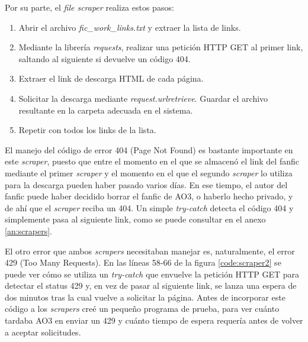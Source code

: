 \documentclass{pre-tfg}
\newcommand{\refToFileScraperCode}{\ref{an:scrapers}}
\begin{document}
Por su parte, el \textit{file scraper} realiza estos pasos:
\begin{enumerate}
	\item Abrir el archivo \textit{fic\_work\_links.txt} y extraer la lista de links.
	\item Mediante la librería \textit{requests}, realizar una petición HTTP GET al primer link, saltando al siguiente si devuelve un código 404.
	\item Extraer el link de descarga HTML de cada página.
	\item Solicitar la descarga mediante \textit{request.urlretrieve}. Guardar el archivo resultante en la carpeta adecuada en el sistema.
	\item Repetir con todos los links de la lista.
\end{enumerate}

El manejo del código de error 404 (Page Not Found) es bastante importante en este \textit{scraper}, puesto que entre el momento en el que se almacenó el link del fanfic mediante el primer \textit{scraper} y el momento en el que el segundo \textit{scraper} lo utiliza para la descarga pueden haber pasado varios días. En ese tiempo, el autor del fanfic puede haber decidido borrar el fanfic de AO3, o haberlo hecho privado, y de ahí que el \textit{scraper} reciba un 404. Un simple \textit{try-catch} detecta el código 404 y simplemente pasa al siguiente link, como se puede consultar en el anexo \refToFileScraperCode.

El otro error que ambos \textit{scrapers} necesitaban manejar es, naturalmente, el error 429 (Too Many Requests). En las líneas 58-66 de la figura \ref{code:scraper2} se puede ver cómo se utiliza un \textit{try-catch} que envuelve la petición HTTP GET para detectar el status 429 y, en vez de pasar al siguiente link, se lanza una espera de dos minutos tras la cual vuelve a solicitar la página. Antes de incorporar este código a los \textit{scrapers} creé un pequeño programa de prueba, para ver cuánto tardaba AO3 en enviar un 429 y cuánto tiempo de espera requería antes de volver a aceptar solicitudes.
 
\end{document}
